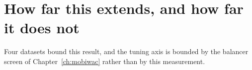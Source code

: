 
\section{How far this extends, and how far it does not}
\label{apx:cosine:extension}

Four datasets bound this result, and the tuning axis is bounded by the balancer screen of
Chapter~\ref{ch:mobiwac} rather than by
this measurement.

